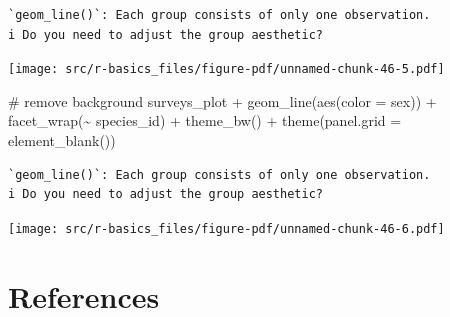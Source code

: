 \documentclass[
  letterpaper,
  DIV=11,
  numbers=noendperiod]{scrreprt}
\newenvironment{Shaded}{\begin{snugshade}}{\end{snugshade}}
\newcommand{\AttributeTok}[1]{\textcolor[rgb]{0.40,0.45,0.13}{#1}}
\newcommand{\CommentTok}[1]{\textcolor[rgb]{0.37,0.37,0.37}{#1}}
\newcommand{\FunctionTok}[1]{\textcolor[rgb]{0.28,0.35,0.67}{#1}}
\newcommand{\NormalTok}[1]{\textcolor[rgb]{0.00,0.23,0.31}{#1}}
\newcommand{\SpecialCharTok}[1]{\textcolor[rgb]{0.37,0.37,0.37}{#1}}
\begin{document}
\begin{verbatim}
`geom_line()`: Each group consists of only one observation.
i Do you need to adjust the group aesthetic?
\end{verbatim}

\texttt{[image: src/r-basics\_files/figure-pdf/unnamed-chunk-46-5.pdf]}

\begin{Shaded}
\begin{Highlighting}[]
\CommentTok{\# remove background}
\NormalTok{surveys\_plot }\SpecialCharTok{+} \FunctionTok{geom\_line}\NormalTok{(}\FunctionTok{aes}\NormalTok{(}\AttributeTok{color =}\NormalTok{ sex)) }\SpecialCharTok{+}
    \FunctionTok{facet\_wrap}\NormalTok{(}\SpecialCharTok{\textasciitilde{}}\NormalTok{ species\_id) }\SpecialCharTok{+}
    \FunctionTok{theme\_bw}\NormalTok{() }\SpecialCharTok{+}
    \FunctionTok{theme}\NormalTok{(}\AttributeTok{panel.grid =} \FunctionTok{element\_blank}\NormalTok{())}
\end{Highlighting}
\end{Shaded}

\begin{verbatim}
`geom_line()`: Each group consists of only one observation.
i Do you need to adjust the group aesthetic?
\end{verbatim}

\texttt{[image: src/r-basics\_files/figure-pdf/unnamed-chunk-46-6.pdf]}

\section{References}\label{references}
\end{document}
